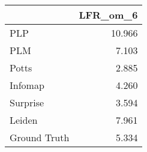 \begin{tabular}{lr}
\toprule
{} & LFR_om_6 \\
\midrule
PLP          &   10.966 \\
PLM          &    7.103 \\
Potts        &    2.885 \\
Infomap      &    4.260 \\
Surprise     &    3.594 \\
Leiden       &    7.961 \\
Ground Truth &    5.334 \\
\bottomrule
\end{tabular}
